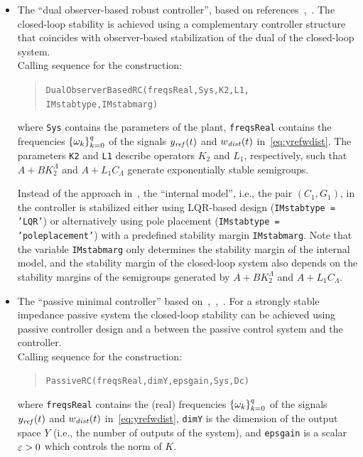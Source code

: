 \documentclass[11pt, a4paper]{amsart}
\newcommand{\CL}{C_\Lambda}
\theoremstyle{definition}
\numberwithin{equation}{section}
\newcommand{\yref}{y_{\mbox{\scriptsize\textit{ref}}}}
\newcommand{\wdist}{w_{\mbox{\scriptsize\textit{dist}}}}
\begin{document}
\begin{itemize}
  \item The ``dual observer-based robust controller'', based on references~,~. The closed-loop stability is achieved using a complementary controller structure that coincides with observer-based stabilization of the dual of the closed-loop system.\\[1ex]
      Calling sequence for the construction:\\[-1ex]
     \begin{quotation}
       \texttt{DualObserverBasedRC(freqsReal,Sys,K2,L1,\\
	 \phantom{a}\hspace{3.7cm} IMstabtype,IMstabmarg)}
     \end{quotation}
     \medskip
     where \texttt{Sys} contains the parameters of the plant, \texttt{freqsReal} contains the frequencies $\{\omega_k\}_{k=0}^q$ of the signals $\yref(t)$ and $\wdist(t)$ in~\eqref{eq:yrefwdist}. The parameters \texttt{K2} and \texttt{L1} describe operators $K_2$ and $L_1$, respectively, such that $A+BK_2^\Lambda$ and $A+L_1\CL$ generate exponentially stable semigroups.

     Instead of the approach in~\cite{Pau16a}, the ``internal model'', i.e., the pair $(C_1,G_1)$, in the controller is stabilized either using LQR-based design (\texttt{IMstabtype = 'LQR'}) or alternatively using pole placement (\texttt{IMstabtype = 'poleplacement'}) with a predefined stability margin \texttt{IMstabmarg}. Note that the variable \texttt{IMstabmarg} only determines the stability margin of the internal model, and the stability margin of the closed-loop system also depends on the stability margins of the semigroups generated by $A+BK_2^\Lambda$ and $A+L_1\CL$.

	\bigskip

  \item The ``passive minimal controller'' based on~,~,~\cite{PauLeG22}. For a strongly stable impedance passive system the closed-loop stability can be achieved using passive controller design and a  between the passive control system and the controller.\\[1ex]
      Calling sequence for the construction:\\[-1ex]
     \begin{quotation}
	 \texttt{PassiveRC(freqsReal,dimY,epsgain,Sys,Dc)}
     \end{quotation}
     \medskip
     where
     \texttt{freqsReal} contains the (real) frequencies $\{\omega_k\}_{k=0}^q$ of the signals $\yref(t)$ and $\wdist(t)$ in~\eqref{eq:yrefwdist}, \texttt{dimY} is the dimension of the output space $Y$ (i.e., the number of outputs of the system), and  \texttt{epsgain} is a scalar $\varepsilon>0$ which controls the norm of $K$.


\end{itemize}
\end{document}
